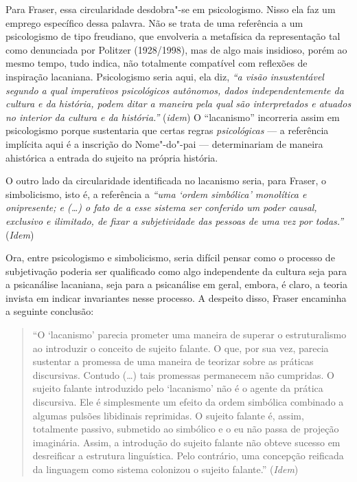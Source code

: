 Para Fraser, essa circularidade desdobra"-se em psicologismo. Nisso ela
faz um emprego específico dessa palavra. Não se trata de uma referência
a um psicologismo de tipo freudiano, que envolveria a metafísica da
representação tal como denunciada por Politzer (1928/1998), mas de algo
mais insidioso, porém ao mesmo tempo, tudo indica, não totalmente
compatível com reflexões de inspiração lacaniana. Psicologismo seria
aqui, ela diz, \emph{``a visão insustentável segundo a qual imperativos
psicológicos autônomos, dados independentemente da cultura e da
história, podem ditar a maneira pela qual} \emph{são interpretados e
atuados no interior da cultura e da história.''} (\emph{idem}) O
``lacanismo'' incorreria assim em psicologismo porque sustentaria que
certas regras \emph{psicológicas} --- a referência implícita aqui é a
inscrição do Nome"-do"-pai --- determinariam de maneira ahistórica a
entrada do sujeito na própria história.

O outro lado da circularidade identificada no lacanismo seria, para
Fraser, o simbolicismo, isto é, a referência a \emph{``uma `ordem
simbólica' monolítica e onipresente; e (\ldots{}) o fato de a esse sistema
ser conferido um poder causal, exclusivo e ilimitado, de fixar a
subjetividade das pessoas de uma vez por todas.''} (\emph{Idem})

Ora, entre psicologismo e simbolicismo, seria difícil pensar como o
processo de subjetivação poderia ser qualificado como algo independente
da cultura seja para a psicanálise lacaniana, seja para a psicanálise em
geral, embora, é claro, a teoria invista em indicar invariantes nesse
processo. A despeito disso, Fraser encaminha a seguinte conclusão:

\begin{quote}
``O `lacanismo' parecia prometer uma maneira de superar o estruturalismo
ao introduzir o conceito de sujeito falante. O que, por sua vez, parecia
sustentar a promessa de uma maneira de teorizar sobre as práticas
discursivas. Contudo (\ldots{}) tais promessas permanecem não cumpridas. O
sujeito falante introduzido pelo `lacanismo' não é o agente da prática
discursiva. Ele é simplesmente um efeito da ordem simbólica combinado a
algumas pulsões libidinais reprimidas. O sujeito falante é, assim,
totalmente passivo, submetido ao simbólico e o eu não passa de projeção
imaginária. Assim, a introdução do sujeito falante não obteve sucesso em
desreificar a estrutura linguística. Pelo contrário, uma concepção
reificada da linguagem como sistema colonizou o sujeito falante.''
(\emph{Idem})
\end{quote}

